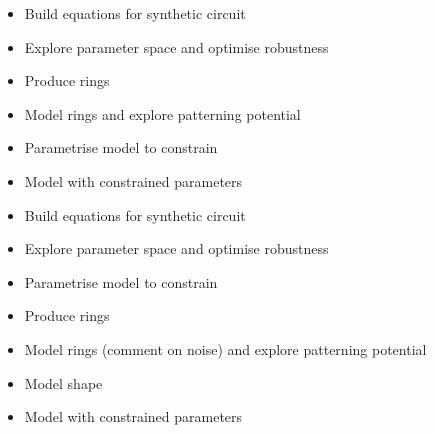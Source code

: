 



\begin{itemize}
    \item Build equations for synthetic circuit
    \item Explore parameter space and optimise robustness
    \item Produce rings
    \item Model rings and explore patterning potential
    \item Parametrise model to constrain
    \item Model with constrained parameters
\end{itemize}

\begin{itemize}
    \item Build equations for synthetic circuit
    \item Explore parameter space and optimise robustness
    \item Parametrise model to constrain

    \item Produce rings
    \item Model rings (comment on noise) and explore patterning potential
    \item Model shape
    \item Model with constrained parameters
\end{itemize}